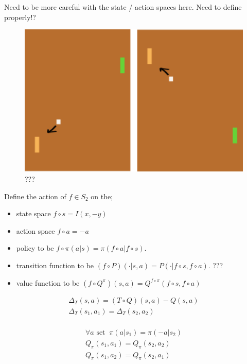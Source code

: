 {\color{red}Need to be more careful with the state / action spaces here. Need to define properly!?}

\begin{figure}[!h]
\centering
\includegraphics[width=1\textwidth,height=0.25\textheight]{../../pictures/drawings/pong-vert-flip.png}
\caption{???}
\end{figure}


Define the action of $f \in S_2$ on the;

\begin{itemize}
	\tightlist
	\item state space $f \circ s = I(x, -y)$
	\item action space $f \circ a = -a$
 	\item policy to be $f \circ \pi(a | s) = \pi(f \circ a | f \circ s)$.
	\item transition function to be $(f \circ P)(\cdot | s, a) = P(\cdot| f \circ s, f \circ a)$. ???
	\item value function to be $(f \circ Q^{\pi})(s, a) = Q^{f \circ \pi}(f \circ s, f \circ a)$
\end{itemize}

\begin{align}
\Delta_{T}(s, a) = (T \circ Q)(s,a) - Q(s,a)\\
\Delta_{T}(s_1, a_1) = \Delta_{T}(s_2, a_2) \\
\end{align}

\begin{align}
\forall a \text{ set}\;\;\pi(a | s_1) = \pi(-a| s_2) \\
Q_\pi(s_1, a_1) = Q_\pi(s_2, a_2) \\
Q_\pi(s_1, a_2) = Q_\pi(s_2, a_1) \\
\end{align}

